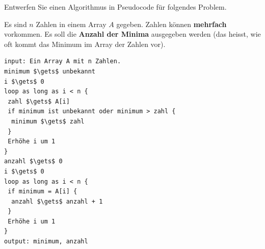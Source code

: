 \begin{exercise}
Entwerfen Sie einen Algorithmus in Pseudocode für folgendes Problem.

\begin{problem}\label{problem-anzahl-minima-n-zahlen}
	Es sind $n$ Zahlen in einem Array $A$ gegeben. Zahlen können \textbf{mehrfach} vorkommen. Es soll die \textbf{Anzahl der Minima} ausgegeben werden (das heisst, wie oft kommt das Minimum im Array der Zahlen vor).
\end{problem}

\end{exercise}
\begin{solution}
\begin{minipage}{\linewidth}
\begin{lstlisting}[language=pseudocode, caption={Algorithmus für das Problem \protect\autoref{problem-anzahl-minima-n-zahlen}}, label={lst-algo-anzahl-minima-n-zahlen}]
input: Ein Array A mit n Zahlen.
minimum $\gets$ unbekannt
i $\gets$ 0
loop as long as i < n {
 zahl $\gets$ A[i]
 if minimum ist unbekannt oder minimum > zahl {
  minimum $\gets$ zahl
 }
 Erhöhe i um 1
}
anzahl $\gets$ 0
i $\gets$ 0
loop as long as i < n {
 if minimum = A[i] {
  anzahl $\gets$ anzahl + 1
 }
 Erhöhe i um 1
}
output: minimum, anzahl
\end{lstlisting}
\end{minipage}
\end{solution}

\newpage

